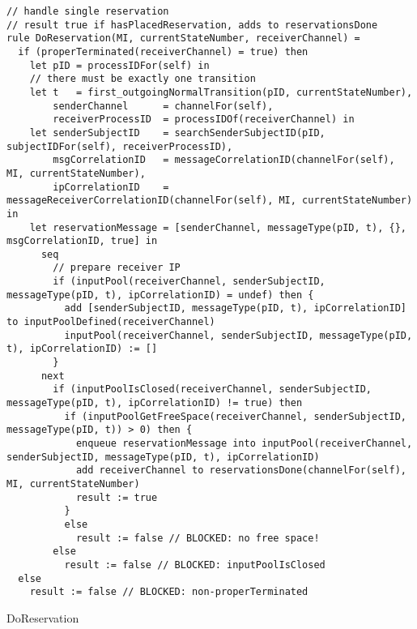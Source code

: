 \begin{listing}[H]
\begin{verbatim}
// handle single reservation
// result true if hasPlacedReservation, adds to reservationsDone
rule DoReservation(MI, currentStateNumber, receiverChannel) =
  if (properTerminated(receiverChannel) = true) then
    let pID = processIDFor(self) in
    // there must be exactly one transition
    let t   = first_outgoingNormalTransition(pID, currentStateNumber),
        senderChannel      = channelFor(self),
        receiverProcessID  = processIDOf(receiverChannel) in
    let senderSubjectID    = searchSenderSubjectID(pID, subjectIDFor(self), receiverProcessID),
        msgCorrelationID   = messageCorrelationID(channelFor(self), MI, currentStateNumber),
        ipCorrelationID    = messageReceiverCorrelationID(channelFor(self), MI, currentStateNumber) in
    let reservationMessage = [senderChannel, messageType(pID, t), {}, msgCorrelationID, true] in
      seq
        // prepare receiver IP
        if (inputPool(receiverChannel, senderSubjectID, messageType(pID, t), ipCorrelationID) = undef) then {
          add [senderSubjectID, messageType(pID, t), ipCorrelationID] to inputPoolDefined(receiverChannel)
          inputPool(receiverChannel, senderSubjectID, messageType(pID, t), ipCorrelationID) := []
        }
      next
        if (inputPoolIsClosed(receiverChannel, senderSubjectID, messageType(pID, t), ipCorrelationID) != true) then
          if (inputPoolGetFreeSpace(receiverChannel, senderSubjectID, messageType(pID, t)) > 0) then {
            enqueue reservationMessage into inputPool(receiverChannel, senderSubjectID, messageType(pID, t), ipCorrelationID)
            add receiverChannel to reservationsDone(channelFor(self), MI, currentStateNumber)
            result := true
          }
          else
            result := false // BLOCKED: no free space!
        else
          result := false // BLOCKED: inputPoolIsClosed
  else
    result := false // BLOCKED: non-properTerminated
\end{verbatim}
\caption{DoReservation}
\label{lst:asm:DoReservation}
\end{listing}




